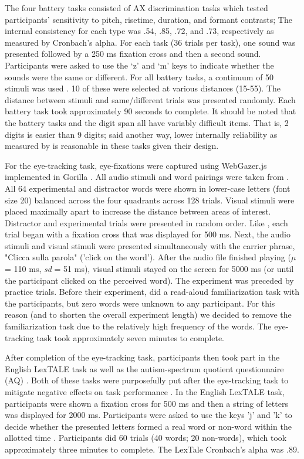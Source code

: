 The four battery tasks consisted of AX discrimination tasks which tested participants' sensitivity to pitch, risetime, duration, and formant contrasts; The internal consistency for each type was .54, .85, .72, and .73, respectively as measured by Cronbach's alpha. For each task (36 trials per task), one sound was presented followed by a 250 ms fixation cross and then a second sound. Participants were asked to use the `z' and `m' keys to indicate whether the sounds were the same or different. For all battery tasks, a continuum of 50 stimuli was used \citep{Kachlicka_Saito_Tierney_2019}. 10 of these were selected at various distances (15-55). The distance between stimuli and same/different trials was presented randomly. Each battery task took approximately 90 seconds to complete. It should be noted that the battery tasks and the digit span all have variably difficult items. That is, 2 digits is easier than 9 digits; said another way, lower internally reliability as measured by \citep{Cronbach1951} is reasonable in these tasks given their design. 

For the eye-tracking task, eye-fixations were captured using WebGazer.js \citep{Papoutsaki} implemented in Gorilla \citep{Anwyl-Irvine_2019}. All audio stimuli and word pairings were taken from \cite{Sulpizio_McQueen_2012}. All 64 experimental and distractor words were shown in lower-case letters (font size 20) balanced across the four quadrants across 128 trials. Visual stimuli were placed maximally apart to increase the distance between areas of interest. Distractor and experimental trials were presented in random order. Like \cite{Sulpizio_McQueen_2012}, each trial began with a fixation cross that was displayed for 500 ms. Next, the audio stimuli and visual stimuli were presented simultaneously with the carrier phrase, "Clicca sulla parola" ('click on the word'). After the audio file finished playing ($\mu$ = 110 ms, \textit{sd} = 51 ms), visual stimuli stayed on the screen for 5000 ms (or until the participant clicked on the perceived word). The experiment was preceded by practice trials. Before their experiment, \cite{Sulpizio_McQueen_2012} did a read-aloud familiarization task with the participants, but zero words were unknown to any participant. For this reason (and to shorten the overall experiment length) we decided to remove the familiarization task due to the relatively high frequency of the words. The eye-tracking task took approximately seven minutes to complete.

After completion of the eye-tracking task, participants then took part in the English LexTALE \citep{lemhofer2012introducing} task as well as the autism-spectrum quotient questionnaire (AQ) \citep{Baron-Cohen2001}. Both of these tasks were purposefully put after the eye-tracking task to mitigate negative effects on task performance \citep{Chang_2024}. In the English LexTALE task, participants were shown a fixation cross for 500 ms and then a string of letters was displayed for 2000 ms. Participants were asked to use the keys 'j' and 'k' to decide whether the presented letters formed a real word or non-word within the allotted time \cite{lemhofer2012introducing}. Participants did 60 trials (40 words; 20 non-words), which took approximately three minutes to complete. The LexTale Cronbach’s alpha was .89.  

